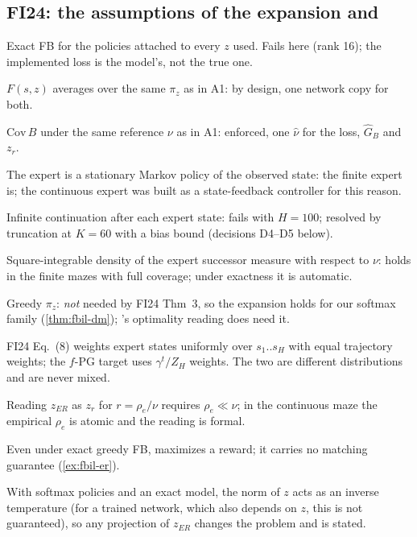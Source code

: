 \subsection{FI24: the assumptions of the \texorpdfstring{\DMFB}{DM-FB} expansion and \texorpdfstring{\ERFB}{ER-FB}}

\begin{description}[style=nextline,leftmargin=1.2cm,font=\normalfont\sffamily]
\item[A1] Exact FB for the policies attached to every $z$ used. Fails here (rank 16); the implemented loss is the model's, not the true one.
\item[A2] $F(s,z)$ averages over the same $\pi_z$ as in A1: by design, one network copy for both.
\item[A3] $\mathrm{Cov}\,B$ under the same reference $\nu$ as in A1: enforced, one $\hat\nu$ for the loss, $\hat G_B$ and $z_r$.
\item[A4] The expert is a stationary Markov policy of the observed state: the finite expert is; the continuous expert was built as a state-feedback controller for this reason.
\item[A5] Infinite continuation after each expert state: fails with $H=100$; resolved by truncation at $K=60$ with a bias bound (decisions D4--D5 below).
\item[A6] Square-integrable density of the expert successor measure with respect to $\nu$: holds in the finite mazes with full coverage; under exactness it is automatic.
\item[A7] Greedy $\pi_z$: \emph{not} needed by FI24 Thm~3, so the \DMFB{} expansion holds for our softmax family (\cref{thm:fbil-dm}); \ERFB's optimality reading does need it.
\item[E1] FI24 Eq.~(8) weights expert states uniformly over $s_1..s_H$ with equal trajectory weights; the $f$-PG target uses $\gamma^t/Z_H$ weights. The two are different distributions and are never mixed.
\item[E2] Reading $z_{ER}$ as $z_{r}$ for $r=\rho_e/\nu$ requires $\rho_e\ll\nu$; in the continuous maze the empirical $\rho_e$ is atomic and the reading is formal.
\item[E3] Even under exact greedy FB, \ERFB{} maximizes a reward; it carries no matching guarantee (\cref{ex:fbil-er}).
\item[E4] With softmax policies and an exact model, the norm of $z$ acts as an inverse temperature (for a trained network, which also depends on $z$, this is not guaranteed), so any projection of $z_{ER}$ changes the problem and is stated.
\end{description}

